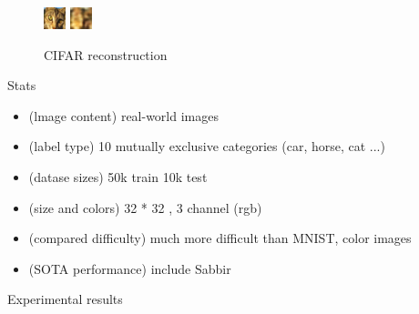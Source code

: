 \documentclass[final]{beamer}
\newlength{\onecolwid}
\begin{document}
\begin{frame}[t]
\begin{columns}[t]
\begin{column}{\onecolwid}
\begin{figure}
\includegraphics[width=0.5\linewidth]{graphics/cifar_image.png}
\includegraphics[width=0.5\linewidth]{graphics/cifar_reconstruction.png}

\caption{CIFAR reconstruction}
\end{figure}

\begin{block}{Stats}
\begin{itemize}
\item (lmage content) real-world images
\item (label type) 10 mutually exclusive categories (car, horse, cat ...)
\item (datase sizes) 50k train 10k test
\item (size and colors) 32 * 32 , 3 channel (rgb)
\item (compared difficulty) much more difficult than MNIST, color images
\item (SOTA performance) include Sabbir
\end{itemize}
\end{block}


\begin{block}{Experimental results}


\end{block}
\end{column}
\end{columns}
\end{frame}
\end{document}
